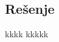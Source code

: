 \documentclass[a4paper,12pt]{report}
\begin{document}


\subsection*{Re\v{s}enje}






\begin{thebibliography}{9}
 kkkk
 kkkkk

\end{thebibliography}
\end{document}
